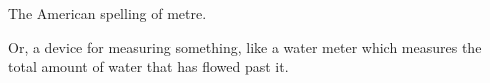 The American spelling of metre.
\par
Or, a device for measuring something, like a 
water meter which measures the total amount of water
that has flowed past it.